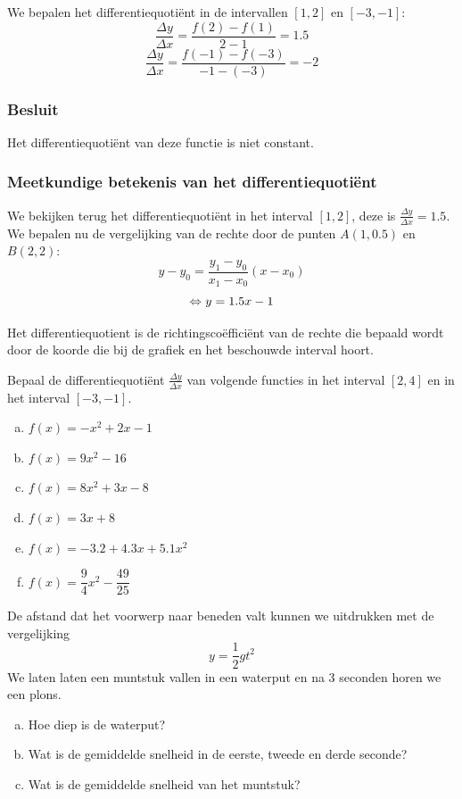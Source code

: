 \documentclass[12pt]{article}
\begin{document}
\begin{theorie}
We bepalen het differentiequotiënt in de intervallen $[1,2]$ en $[-3,-1]$:\\
$$\dfrac{\Delta y}{\Delta x}=\dfrac{f(2)-f(1)}{2-1}=1.5$$
$$\dfrac{\Delta y}{\Delta x}=\dfrac{f(-1)-f(-3)}{-1-(-3)}=-2$$

\subsubsection{Besluit}
Het differentiequotiënt van deze functie is niet constant.

\subsubsection{Meetkundige betekenis van het differentiequotiënt}

We bekijken terug het differentiequotiënt in het interval $[1,2]$, deze is $\frac{\Delta y}{\Delta x}=1.5$. We bepalen nu de vergelijking van de rechte door de punten $A(1, 0.5)$ en $B(2,2)$:
$$y-y_0=\dfrac{y_1-y_0}{x_1-x_0}(x-x_0)$$
$$\Leftrightarrow y=1.5x-1$$

Het differentiequotient is de richtingscoëfficiënt van de rechte die bepaald wordt door de koorde die bij de grafiek en het beschouwde interval hoort.

\end{theorie}

\begin{oefening}
Bepaal de differentiequotiënt $\frac{\Delta y}{\Delta x}$ van volgende functies in het interval $[2,4]$ en in het interval $[-3,-1]$.
\begin{multicols}{2}
\begin{enumerate}[(a)]
  \itemsep.2em
  \item $\displaystyle f(x)=-x^2+2x-1$
  \item $\displaystyle f(x)=9x^2-16$
  \item $\displaystyle f(x)=8x^2+3x-8$
  \item $\displaystyle f(x)=3x+8$
  \item $\displaystyle f(x)=-3.2+4.3x+5.1x^2$
  \item $\displaystyle f(x)=\dfrac{9}{4}x^2-\dfrac{49}{25}$
\end{enumerate}
\end{multicols}
\end{oefening}

\begin{oefening}
De afstand dat het voorwerp naar beneden valt kunnen we uitdrukken met de vergelijking
$$y=\dfrac{1}{2}gt^2$$
We laten laten een muntstuk vallen in een waterput en na 3 seconden horen we een plons.
\begin{enumerate}[(a)]
  \item Hoe diep is de waterput?
  \item Wat is de gemiddelde snelheid in de eerste, tweede en derde seconde?
  \item Wat is de gemiddelde snelheid van het muntstuk?
\end{enumerate}
\end{oefening}
\end{document}
